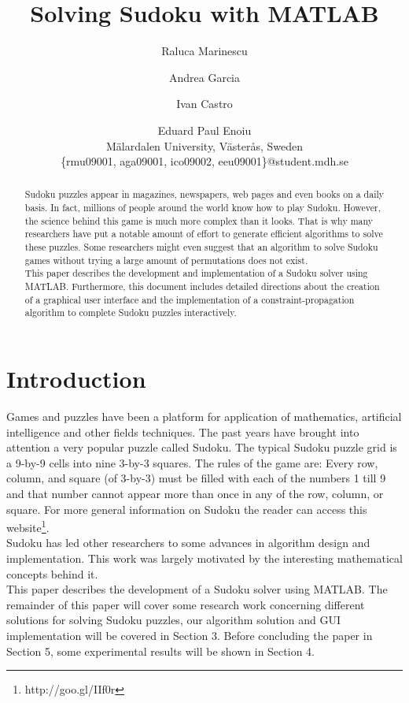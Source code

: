\documentclass[12pt,a4paper]{article} %
\title{\bf{Solving Sudoku with MATLAB}} %
\author{Raluca Marinescu \and Andrea Garcia \and Ivan Castro \and Eduard Paul Enoiu \\
  Mälardalen University, Västerås, Sweden\\
  \textsf{\{rmu09001, aga09001,  ico09002, eeu09001\}@student.mdh.se}}
\begin{document}
\maketitle %
\begin{abstract}
Sudoku puzzles appear in magazines, newspapers, web pages and even books on a daily basis. In fact, millions of people around the world know how to play Sudoku. However, the science behind this game is much more complex than it looks. That is why many researchers have put a notable amount of effort to generate efficient algorithms to solve these puzzles. Some researchers might even suggest that an algorithm to solve Sudoku games without trying a large amount of permutations does not exist.\newline
\\This paper describes the development and implementation of a Sudoku solver using MATLAB. Furthermore, this document includes detailed directions about the creation of a graphical user interface and the implementation of a constraint-propagation algorithm to complete Sudoku puzzles interactively.

\end{abstract}
\newpage
\tableofcontents
\newpage
\section{Introduction}
Games and puzzles have been a platform for application of mathematics, artificial intelligence and other fields techniques. The past years have brought into attention a very popular puzzle called Sudoku. The typical Sudoku puzzle grid is a 9-by-9 cells into nine 3-by-3 squares. The rules of the game are: Every row, column, and square (of 3-by-3) must be filled with each of the numbers 1 till 9 and that number cannot appear more than once in any of the row, column, or square. For more general information on Sudoku the reader can access this website\footnote{http://goo.gl/IIf0r}.
\newline
\\Sudoku has led other researchers to some advances in algorithm design and implementation. This work was largely motivated by the interesting mathematical concepts behind it.
\newline
\\ This paper describes the development of a Sudoku solver using MATLAB. The remainder of this paper will cover some research work concerning different solutions for solving Sudoku puzzles, our algorithm solution and GUI implementation will be covered in Section 3. Before concluding the paper in Section 5, some experimental results will be shown in Section 4.
\end{document}
